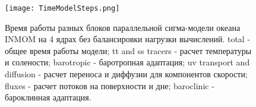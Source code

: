 \begin{figure}[htb!]
	\center
	\texttt{[image: TimeModelSteps.png]}
	\caption{Время работы разных блоков параллельной сигма-модели океана INMOM на 4 ядрах без балансировки нагрузки вычислений. 
	total - общее время работы модели; 
	tt and ss tracers - расчет температуры и солености; 
	barotropic - баротропная адаптация; 
	uv transport and diffusion - расчет переноса и диффузии для компонентов скорости;
	fluxes - расчет потоков на поверхности и дне; 
	baroclinic - бароклинная адаптация.}
	\label{fig:timemodelsteps}
\end{figure}

\FloatBarrier
